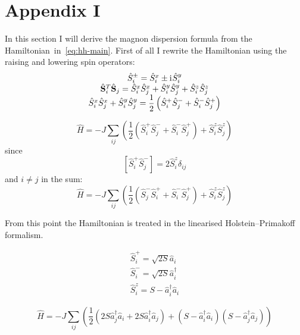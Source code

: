 \section{Appendix I}

In this section I will derive the magnon dispersion formula from the Hamiltonian~in~\eqref{eq:hh-main}.
First of all I rewrite the Hamiltonian using the raising and lowering spin operators:
\begin{equation}
    \begin{matrix}
        \hat{S}_i^{\pm} = \hat{S}_i^x \pm \mathrm{i}\mkern1mu \hat{S}_i^y \\
        \hat{\mathbf{S}}_i^T \hat{\mathbf{S}}_j = \hat{S}_i^x \hat{S}_j^x + \hat{S}_i^y \hat{S}_j^y + \hat{S}_i^z \hat{S}_j^z \\
        \hat{S}_i^x \hat{S}_j^x + \hat{S}_i^y \hat{S}_j^y = \dfrac{1}{2}\left(
            \hat{S}_i^+\hat{S}_j^- + \hat{S}_i^-\hat{S}_j^+
        \right)
    \end{matrix}
\end{equation}

\begin{equation}
    \hat{H} = -J \sum_{ij} \left(\dfrac{1}{2}\left(
        \hat{S}_i^+\hat{S}_j^- + \hat{S}_i^-\hat{S}_j^+\right) + \hat{S}_i^z \hat{S}_j^z\right)
\end{equation}
since
\begin{equation}
    \left[\hat{S}_i^+\hat{S}_j^-\right] = 2\hat{S}_i^z\delta_{ij}
\end{equation}
and $i\ne j$ in the sum:
\begin{equation}
    \hat{H} =-J \sum_{ij} \left(\dfrac{1}{2}\left(
            \hat{S}_j^-\hat{S}_i^+ + \hat{S}_i^-\hat{S}_j^+\right) + \hat{S}_i^z \hat{S}_j^z\right)
\end{equation}

From this point the Hamiltonian is treated in the linearised Holstein–Primakoff formalism.

\begin{equation}
    \begin{matrix}
        \hat{S}_i^+ = \sqrt{2S}\hat{a}_i \\
        \hat{S}_i^- = \sqrt{2S}\hat{a}_i^{\dag} \\
        \hat{S}_i^z = S - \hat{a}_i^{\dag}\hat{a}_i
    \end{matrix}
\end{equation}

\begin{equation}
    \hat{H} = -J \sum_{ij} \left(\dfrac{1}{2}\left(
        2S\hat{a}_j^{\dag}\hat{a}_i + 2S\hat{a}_i^{\dag}\hat{a}_j\right) + 
        \left(S - \hat{a}_i^{\dag}\hat{a}_i\right)\left(S - \hat{a}_j^{\dag}\hat{a}_j\right)\right)
\end{equation}

